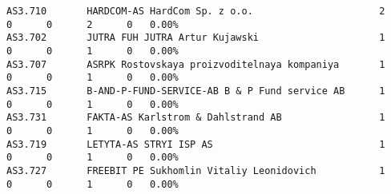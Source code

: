 \begin{lstlisting}[frame=brl]
AS3.710       HARDCOM-AS HardCom Sp. z o.o.                      2      0      0      2      0   0.00%
AS3.702       JUTRA FUH JUTRA Artur Kujawski                     1      0      0      1      0   0.00%
AS3.707       ASRPK Rostovskaya proizvoditelnaya kompaniya       1      0      0      1      0   0.00%
AS3.715       B-AND-P-FUND-SERVICE-AB B & P Fund service AB      1      0      0      1      0   0.00%
AS3.731       FAKTA-AS Karlstrom & Dahlstrand AB                 1      0      0      1      0   0.00%
AS3.719       LETYTA-AS STRYI ISP AS                             1      0      0      1      0   0.00%
AS3.727       FREEBIT PE Sukhomlin Vitaliy Leonidovich           1      0      0      1      0   0.00%
\end{lstlisting}



